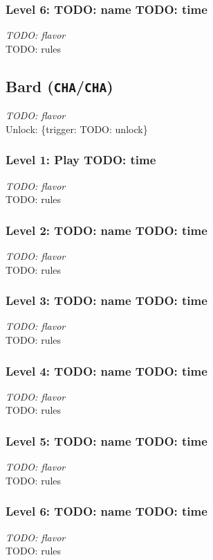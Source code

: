 \documentclass[12pt]{article}
\newcommand{\CHA}{\texttt{CHA}}
\newcommand{\TRIG}[1]{\{trigger: #1\}}
\newcommand{\Class}[4]{\pagebreak\subsection{#1 (#2)}\label{#1}\textit{#3}\\[1mm]Unlock: \TRIG{#4}}
\newcommand{\Skill}[5]{\subsubsection{Level #1: #2 #3}\textit{#4}\\[1mm]#5}
\begin{document}
\Skill{6}{TODO: name}{TODO: time}
{TODO: flavor}
{TODO: rules}

%

\Class{Bard}{\CHA/\CHA}
{TODO: flavor}
{TODO: unlock}

\Skill{1}{Play}{TODO: time}
{TODO: flavor}
{TODO: rules}

\Skill{2}{TODO: name}{TODO: time}
{TODO: flavor}
{TODO: rules}

\Skill{3}{TODO: name}{TODO: time}
{TODO: flavor}
{TODO: rules}

\Skill{4}{TODO: name}{TODO: time}
{TODO: flavor}
{TODO: rules}

\Skill{5}{TODO: name}{TODO: time}
{TODO: flavor}
{TODO: rules}

\Skill{6}{TODO: name}{TODO: time}
{TODO: flavor}
{TODO: rules}
\end{document}
